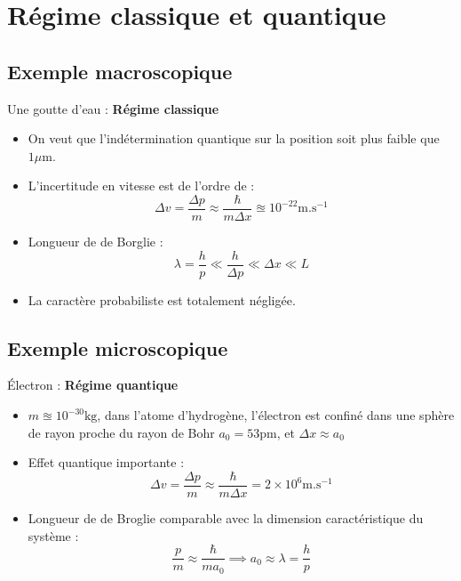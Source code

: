 \section{Régime classique et quantique} %


\subsection{Exemple macroscopique} %

Une goutte d'eau : \textbf{Régime classique}
\begin{itemize}

    \item On veut que l'indétermination quantique sur la position soit plus faible que $1 \mu\mathrm{m}$. 
    \item L'incertitude en vitesse est de l'ordre de :
      \begin{equation}
        \Delta v = \frac{\Delta p}{ m}  \approx \frac{\hbar}{m \Delta x}  \approxeq 10 ^{-22} \mathrm{m}. \mathrm{s} ^{-1}
      \end{equation}
    \item Longueur de de Borglie : 
      \begin{equation}
        \lambda = \frac{h}{p}  \ll  \frac{h}{\Delta p} \ll \Delta x \ll L
      \end{equation}
    \item La caractère probabiliste est totalement négligée.

\end{itemize}

\subsection{Exemple microscopique} %
\label{sub:Exemple microscopique}


Électron : \textbf{Régime quantique}
\begin{itemize}

    \item $m \approxeq 10 ^{-30} \mathrm{kg}$, dans l'atome d'hydrogène, l'électron est confiné dans une sphère de rayon proche du rayon de Bohr $a_0 = 53 \mathrm{pm}$, et $\Delta x \approx a_0$

    \item Effet quantique importante : 
      \begin{equation}
        \Delta v = \frac{\Delta p}{m}  \approx \frac{\hbar}{m \Delta x}  = 2 \times 10 ^{6} \mathrm{m}. \mathrm{s} ^{-1}
      \end{equation}

    \item Longueur de de Broglie comparable avec la dimension caractéristique du système : 
      \begin{equation}
        \frac{p}{m}  \approx \frac{\hbar}{m a_0}  \implies a_0 \approx \lambda = \frac{h}{p} 
      \end{equation}



\end{itemize}

